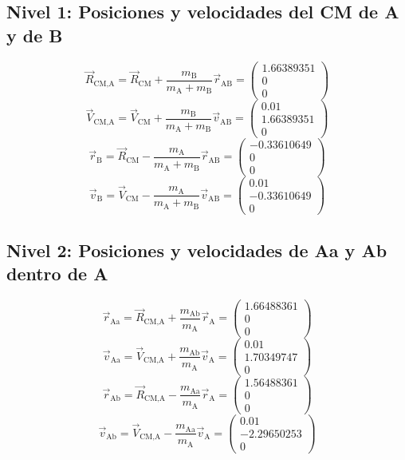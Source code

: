 \subsection{Nivel 1: Posiciones y velocidades del CM de A y de B}
\[
\vec{R}_{\text{CM,A}} = \vec{R}_{\text{CM}} + \frac{m_{\text{B}}}{m_{\text{A}} + m_{\text{B}}} \vec{r}_{\text{AB}} = \begin{pmatrix} 1.66389351 \\ 0 \\ 0 \end{pmatrix}
\]
\[
\vec{V}_{\text{CM,A}} = \vec{V}_{\text{CM}} + \frac{m_{\text{B}}}{m_{\text{A}} + m_{\text{B}}} \vec{v}_{\text{AB}} = \begin{pmatrix} 0.01 \\ 1.66389351 \\ 0 \end{pmatrix}
\]
\[
\vec{r}_{\text{B}} = \vec{R}_{\text{CM}} - \frac{m_{\text{A}}}{m_{\text{A}} + m_{\text{B}}} \vec{r}_{\text{AB}} = \begin{pmatrix} -0.33610649 \\ 0 \\ 0 \end{pmatrix}
\]
\[
\vec{v}_{\text{B}} = \vec{V}_{\text{CM}} - \frac{m_{\text{A}}}{m_{\text{A}} + m_{\text{B}}} \vec{v}_{\text{AB}} = \begin{pmatrix} 0.01 \\ -0.33610649 \\ 0 \end{pmatrix}
\]

\subsection{Nivel 2: Posiciones y velocidades de Aa y Ab dentro de A}
\[
\vec{r}_{\text{Aa}} = \vec{R}_{\text{CM,A}} + \frac{m_{\text{Ab}}}{m_{\text{A}}} \vec{r}_{\text{A}} = \begin{pmatrix} 1.66488361 \\ 0 \\ 0 \end{pmatrix}
\]
\[
\vec{v}_{\text{Aa}} = \vec{V}_{\text{CM,A}} + \frac{m_{\text{Ab}}}{m_{\text{A}}} \vec{v}_{\text{A}} = \begin{pmatrix} 0.01 \\ 1.70349747 \\ 0 \end{pmatrix}
\]
\[
\vec{r}_{\text{Ab}} = \vec{R}_{\text{CM,A}} - \frac{m_{\text{Aa}}}{m_{\text{A}}} \vec{r}_{\text{A}} = \begin{pmatrix} 1.56488361 \\ 0 \\ 0 \end{pmatrix}
\]
\[
\vec{v}_{\text{Ab}} = \vec{V}_{\text{CM,A}} - \frac{m_{\text{Aa}}}{m_{\text{A}}} \vec{v}_{\text{A}} = \begin{pmatrix} 0.01 \\ -2.29650253 \\ 0 \end{pmatrix}
\]

